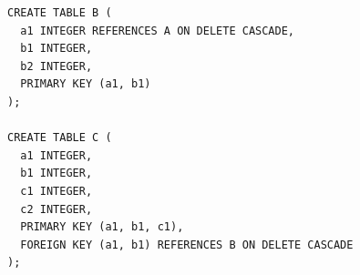 \documentclass[10pt, landscape]{article}
\begin{document}
\begin{multicols}{4}
\begin{minipage}[c]{0.52\linewidth}
\begin{lstlisting}[style=mySQL, basicstyle=\tiny]
CREATE TABLE B (
  a1 INTEGER REFERENCES A ON DELETE CASCADE,
  b1 INTEGER,
  b2 INTEGER,
  PRIMARY KEY (a1, b1) 
);

CREATE TABLE C ( 
  a1 INTEGER, 
  b1 INTEGER,
  c1 INTEGER,
  c2 INTEGER,
  PRIMARY KEY (a1, b1, c1),
  FOREIGN KEY (a1, b1) REFERENCES B ON DELETE CASCADE
);
    \end{lstlisting}
  \end{minipage}




\end{multicols}
\end{document}
